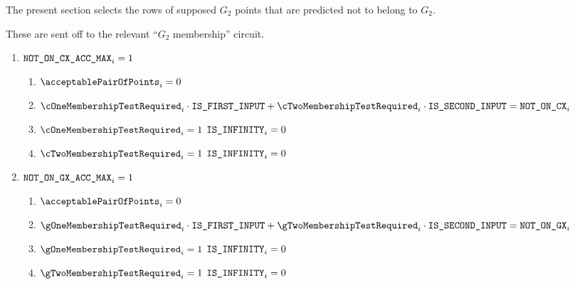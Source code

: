 The present section selects the rows of supposed $G_2$ points that are predicted not to belong to $G_2$.


These are sent off to the relevant ``$G_2$ membership'' circuit.
\begin{enumerate}
    \item \If $\texttt{NOT\_ON\_CX\_ACC\_MAX}_{i} = 1$ \Then
          \begin{enumerate}
              \item $\acceptablePairOfPoints_{i} = 0$
              \item $\cOneMembershipTestRequired _{i} \cdot \isFirstInput + \cTwoMembershipTestRequired _{i} \cdot \isSecondInput = \notOnCX_{i}$ %
              \item \If $\cOneMembershipTestRequired _{i} = 1$ \Then $\texttt{IS\_INFINITY}_{i} = 0$
              \item \If $\cTwoMembershipTestRequired _{i} = 1$ \Then $\texttt{IS\_INFINITY}_{i} = 0$
          \end{enumerate}
    \item \If $\texttt{NOT\_ON\_GX\_ACC\_MAX}_{i} = 1$ \Then
          \begin{enumerate}
              \item $\acceptablePairOfPoints_{i} = 0$
              \item $\gOneMembershipTestRequired _{i} \cdot \isFirstInput + \gTwoMembershipTestRequired _{i} \cdot \isSecondInput = \notOnGX_{i}$ %
              \item \If $\gOneMembershipTestRequired _{i} = 1$ \Then $\texttt{IS\_INFINITY}_{i} = 0$
              \item \If $\gTwoMembershipTestRequired _{i} = 1$ \Then $\texttt{IS\_INFINITY}_{i} = 0$
          \end{enumerate}
\end{enumerate}


